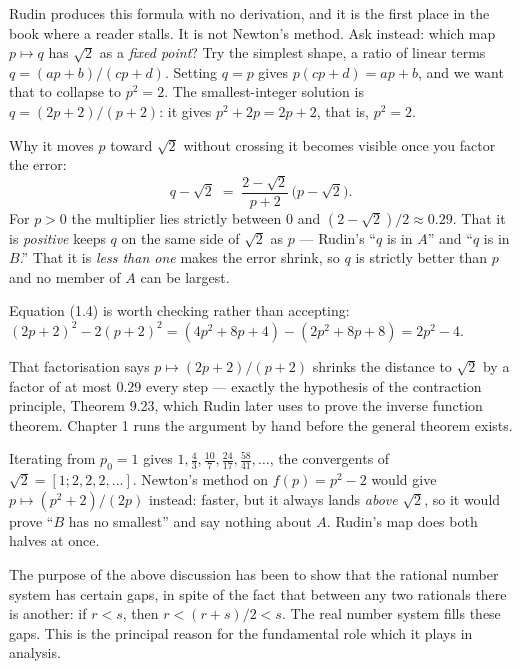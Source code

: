 \documentclass[11pt,twoside]{article}
\begin{document}
\begin{unpack}
Rudin produces this formula with no derivation, and it is the first place in the
book where a reader stalls. It is not Newton's method. Ask instead: which map
$p \mapsto q$ has $\sqrt2$ as a \emph{fixed point}? Try the simplest shape, a
ratio of linear terms $q = (ap+b)/(cp+d)$. Setting $q = p$ gives
$p(cp+d) = ap+b$, and we want that to collapse to $p^2 = 2$. The
smallest-integer solution is $q = (2p+2)/(p+2)$: it gives $p^2 + 2p = 2p+2$,
that is, $p^2 = 2$.

Why it moves $p$ toward $\sqrt2$ without crossing it becomes visible once you
factor the error:
\[
  q - \sqrt2 \;=\; \frac{2-\sqrt2}{p+2}\,\bigl(p - \sqrt2\bigr).
\]
For $p>0$ the multiplier lies strictly between $0$ and
$(2-\sqrt2)/2 \approx 0.29$. That it is \emph{positive} keeps $q$ on the same
side of $\sqrt2$ as $p$ --- Rudin's ``$q$ is in $A$'' and ``$q$ is in $B$.'' That
it is \emph{less than one} makes the error shrink, so $q$ is strictly better
than $p$ and no member of $A$ can be largest.

Equation (1.4) is worth checking rather than accepting:
$(2p+2)^2 - 2(p+2)^2 = (4p^2+8p+4)-(2p^2+8p+8) = 2p^2-4$.
\end{unpack}

\begin{deeper}
That factorisation says $p \mapsto (2p+2)/(p+2)$ shrinks the distance to
$\sqrt2$ by a factor of at most $0.29$ every step --- exactly the hypothesis of
the contraction principle, Theorem 9.23, which Rudin later uses to prove the
inverse function theorem. Chapter 1 runs the argument by hand before the general
theorem exists.

Iterating from $p_0 = 1$ gives $1, \tfrac43, \tfrac{10}{7}, \tfrac{24}{17},
\tfrac{58}{41}, \dots$, the convergents of $\sqrt2 = [1;2,2,2,\dots]$. Newton's
method on $f(p) = p^2-2$ would give $p \mapsto (p^2+2)/(2p)$ instead: faster,
but it always lands \emph{above} $\sqrt2$, so it would prove ``$B$ has no
smallest'' and say nothing about $A$. Rudin's map does both halves at once.
\end{deeper}

The purpose of the above discussion has been to show that the rational number
system has certain gaps, in spite of the fact that between any two rationals
there is another: if $r < s$, then $r < (r+s)/2 < s$. The
real number system fills these gaps. This is the principal reason for the
fundamental role which it plays in analysis.
\end{document}
